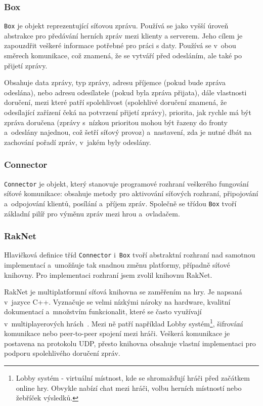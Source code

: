 \documentclass[thesis=B,czech,hidelinks]{FITthesis}[2012/06/26] %
\newcommand{\code}[1]{\texttt{#1}}
\begin{document}
\subsubsection{Box}

\code{Box} je objekt reprezentující síťovou zprávu. Používá se jako vyšší úroveň abstrakce pro předávání herních zpráv mezi klienty a serverem. Jeho cílem je zapouzdřit veškeré informace potřebné pro práci s daty. Používá se v~obou směrech komunikace, což znamená, že se vytváří před odesláním, ale také po přijetí zprávy.

Obsahuje data zprávy, typ zprávy, adresu příjemce (pokud bude zpráva odeslána), nebo adresu odesílatele (pokud byla zpráva přijata), dále vlastnosti doručení, mezi které patří spolehlivost (spolehlivé doručení znamená, že odesílající zařízení čeká na potvrzení přijetí zprávy), priorita, jak rychle má být zpráva doručena (zprávy s~nízkou prioritou mohou být řazeny do fronty a~odeslány najednou, což šetří síťový provoz) a~nastavení, zda je nutné dbát na zachování pořadí zpráv, v~jakém byly odeslány.

\subsubsection{Connector}

\code{Connector} je objekt, který stanovuje programové rozhraní veškerého fungování síťové komunikace: obsahuje metody pro aktivování síťových rozhraní, připojování a~odpojování klientů, posílání a~příjem zpráv. Společně se třídou \code{Box} tvoří základní pilíř pro výměnu zpráv mezi hrou a~ovladačem.

\subsubsection{RakNet}

Hlavičková definice tříd \code{Connector} i~\code{Box} tvoří abstraktní rozhraní nad samotnou implementací a~umožňuje tak snadnou změnu platformy, případně síťové knihovny. Pro implementaci rozhraní jsem zvolil knihovnu RakNet.

RakNet je multiplatformní síťová knihovna se zaměřením na hry. Je napsaná v~jazyce C++. Vyznačuje se velmi nízkými nároky na hardware, kvalitní dokumentací a~množstvím funkcionalit, které se často využívají v~multiplayerových hrách~\cite{raknet}. Mezi ně patří například Lobby systém\footnote{Lobby systém - virtuální místnost, kde se shromažďují hráči před začátkem online hry. Obvykle nabízí chat mezi hráči, volbu herních místností nebo žebříček výsledků.}, šifrování komunikace nebo peer-to-peer spojení mezi hráči. Veškerá komunikace je postavena na protokolu UDP, přesto knihovna obsahuje vlastní implementaci pro podporu spolehlivého doručení zpráv.
\end{document}
